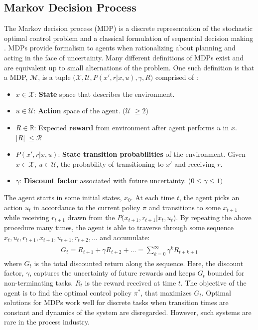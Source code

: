 \subsection{Markov Decision Process}
The Markov decision process (MDP) is a discrete representation of the stochastic optimal control problem and a classical formulation of sequential decision making \cite{sutton}.  MDPs provide formalism to agents when rationalizing about planning and acting in the face of uncertainty.  Many different definitions of MDPs exist and are equivalent up to small alternations of the problem.  One such definition is that a MDP, $\mathcal{M}$, is a tuple $(\mathcal{X}, \mathcal{U}$$, P(x', r|x, u), \gamma, R)$ comprised of \cite{ng_ref12}:
\begin{itemize}
    \item $x \in \mathcal{X}$: \textbf{State} space that describes the environment.
    \item $u \in \mathcal{U}$: \textbf{Action} space of the agent. ($     \mathcal{U}$ $ \geq 2 $)
    \item $R \in \mathbb{R}$: Expected \textbf{reward} from environment after agent performs $u$ in $x$. $|R| \; \leq \mathcal{R}$
    
    \item $P(x', r|x, u)$: \textbf{State transition probabilities} of the environment.  Given $x \in \mathcal{X}$, $u \in \mathcal{U}$, the probability of transitioning to $x'$ and receiving $r$.
    \item $\gamma$: \textbf{Discount factor} associated with future uncertainty.  ($0 \leq \gamma \leq 1)$
\end{itemize}
The agent starts in some initial states, $x_0$.  At each time $t$, the agent picks an action $u_t$ in accordance to the current policy $\pi$ and transitions to some $x_{t+1}$ while receiving $r_{t+1}$ drawn from the $P(x_{t+1}, r_{t+1} | x_t, u_t$).  By repeating the above procedure many times, the agent is able to traverse through some sequence $x_t, u_t, r_{t+1}, x_{t+1}, u_{t+1}, r_{t+2}, ...$ and accumulate:
\begin{eqnarray}
\begin{array}{rcl}
G_t = R_{t+1} + \gamma R_{t+2} + ... = \sum\limits^{\infty}_{k = 0} \gamma^k R_{t+k+1}
\end{array}
\label{eq:return}
\end{eqnarray}
where $G_t$ is the total discounted return along the sequence.  Here, the discount factor, $\gamma$, captures the uncertainty of future rewards and keeps $G_t$ bounded for non-terminating tasks. $R_t$ is the reward received at time $t$. The objective of the agent is to find the optimal control policy $\pi^*$, that maximizes $G_t$. Optimal solutions for MDPs work well for discrete tasks when transition times are constant and dynamics of the system are disregarded. However, such systems are rare in the process industry.  

